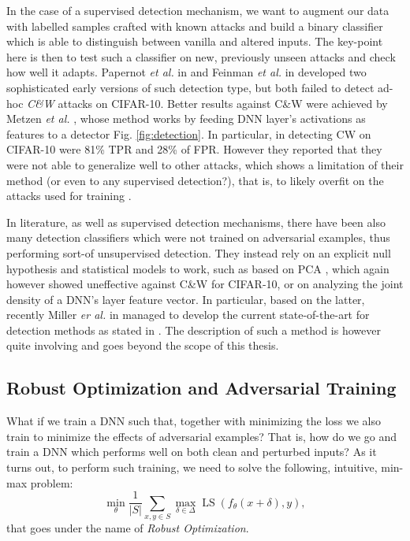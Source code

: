 \documentclass[LaM,binding=0.6cm]{./packages/sapthesis/sapthesis}
\begin{document}
            In the case of a supervised detection mechanism, we want to augment our data with labelled samples crafted with known
            attacks and build a binary classifier which is able to distinguish between vanilla and altered inputs. The key-point here is then to test such a classifier on new, previously unseen attacks and check how well it adapts.  
            Papernot \textit{et al.} in \cite{grosse2017statistical} and Feinman \textit{et al.} in \cite{feinman2017detecting}
            developed two sophisticated early versions of such detection type, but both failed to detect ad-hoc \textit{C\&W} \cite{towards_eval_robustness} attacks on CIFAR-10.
            Better results against C\&W were achieved  by Metzen \textit{et al.} \cite{adv_detect}, whose method
            works by feeding DNN layer's activations as features to a detector Fig. \ref{fig:detection}. In particular, in detecting CW on CIFAR-10
            were 81\% TPR and 28\% of FPR. However they reported that they were not able to generalize well 
            to other attacks, which shows a limitation of their method (or even to any supervised detection?), 
            that is, to likely overfit on the attacks used for training \cite{carliniattack1}.

            In literature, as well as supervised detection mechanisms, there have been also many 
            detection classifiers which were not trained on adversarial examples, thus performing sort-of unsupervised detection.
            They instead rely on an explicit null hypothesis and statistical models to work, such as based on PCA \cite{hendrycks2016early}, which again however showed uneffective against C\&W for CIFAR-10, 
            or on analyzing the joint density of a DNN's layer feature vector.
            In particular, based on the latter, recently Miller \textit{er al.} in \cite{miller2018anomaly} managed to develop the current state-of-the-art for detection
            methods as stated in \cite{adv_survey1}. The description of such a method is however quite involving and goes beyond the scope of this thesis.
            
            
            
            \subsection{Robust Optimization and Adversarial Training}

                What if we train a DNN such that, together with minimizing the loss we also
                train to minimize the effects of adversarial examples? That is, how do we go and train
                a DNN which performs well on both clean and perturbed inputs? As it turns out, to perform
                such training, we need to solve the following, intuitive, min-max problem:
                \begin{equation}
                    \label{robopt}
                    \underset{\theta}{\operatorname{min}} \frac{1}{|S|} \sum_{x, y \in S} \max _{\delta \in \Delta} \operatorname{LS}\left(f_{\theta}(x+\delta), y\right),
                \end{equation}
                that goes under the name of \textit{Robust Optimization}.
                
\end{document}
